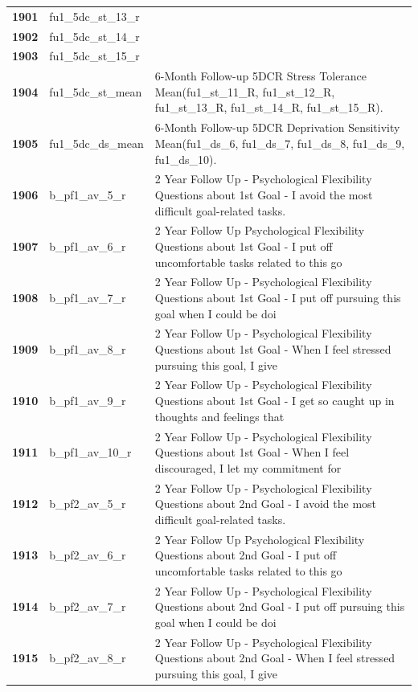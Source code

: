 \documentclass[
  letterpaper,
  DIV=11,
  numbers=noendperiod]{scrartcl}
\begin{document}
\begin{longtable}[t]{>{}cll}
\textbf{1901} & fu1\_5dc\_st\_13\_r & \\
\textbf{1902} & fu1\_5dc\_st\_14\_r & \\
\textbf{1903} & fu1\_5dc\_st\_15\_r & \\
\textbf{1904} & fu1\_5dc\_st\_mean & 6-Month Follow-up 5DCR Stress Tolerance Mean(fu1\_st\_11\_R, fu1\_st\_12\_R, fu1\_st\_13\_R,  fu1\_st\_14\_R, fu1\_st\_15\_R).\\
\textbf{1905} & fu1\_5dc\_ds\_mean & 6-Month Follow-up 5DCR Deprivation Sensitivity Mean(fu1\_ds\_6, fu1\_ds\_7, fu1\_ds\_8, fu1\_ds\_9, fu1\_ds\_10).\\
\addlinespace
\textbf{1906} & b\_pf1\_av\_5\_r & 2 Year Follow Up - Psychological Flexibility Questions about 1st Goal - I avoid the most difficult goal-related tasks.\\
\textbf{1907} & b\_pf1\_av\_6\_r & 2 Year Follow Up Psychological Flexibility Questions about 1st Goal - I put off uncomfortable tasks related to this go\\
\textbf{1908} & b\_pf1\_av\_7\_r & 2 Year Follow Up - Psychological Flexibility Questions about 1st Goal - I put off pursuing this goal when I could be doi\\
\textbf{1909} & b\_pf1\_av\_8\_r & 2 Year Follow Up - Psychological Flexibility Questions about 1st Goal - When I feel stressed pursuing this goal, I give\\
\textbf{1910} & b\_pf1\_av\_9\_r & 2 Year Follow Up - Psychological Flexibility Questions about 1st Goal - I get so caught up in thoughts and feelings that\\
\addlinespace
\textbf{1911} & b\_pf1\_av\_10\_r & 2 Year Follow Up - Psychological Flexibility Questions about 1st Goal - When I feel discouraged, I let my commitment for\\
\textbf{1912} & b\_pf2\_av\_5\_r & 2 Year Follow Up - Psychological Flexibility Questions about 2nd Goal - I avoid the most difficult goal-related tasks.\\
\textbf{1913} & b\_pf2\_av\_6\_r & 2 Year Follow Up Psychological Flexibility Questions about 2nd Goal - I put off uncomfortable tasks related to this go\\
\textbf{1914} & b\_pf2\_av\_7\_r & 2 Year Follow Up - Psychological Flexibility Questions about 2nd Goal - I put off pursuing this goal when I could be doi\\
\textbf{1915} & b\_pf2\_av\_8\_r & 2 Year Follow Up - Psychological Flexibility Questions about 2nd Goal - When I feel stressed pursuing this goal, I give\\

\end{longtable}
\end{document}
